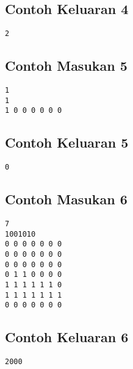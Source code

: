 \documentclass{article}
\begin{document}
\subsection*{Contoh Keluaran 4}
\begin{lstlisting}
2
\end{lstlisting}

\subsection*{Contoh Masukan 5}
\begin{lstlisting}
1
1
1 0 0 0 0 0 0
\end{lstlisting}
\subsection*{Contoh Keluaran 5}
\begin{lstlisting}
0
\end{lstlisting}

\subsection*{Contoh Masukan 6}
\begin{lstlisting}
7
1001010
0 0 0 0 0 0 0
0 0 0 0 0 0 0
0 0 0 0 0 0 0
0 1 1 0 0 0 0
1 1 1 1 1 1 0
1 1 1 1 1 1 1
0 0 0 0 0 0 0
\end{lstlisting}
\subsection*{Contoh Keluaran 6}
\begin{lstlisting}
2000
\end{lstlisting}
\end{document}
